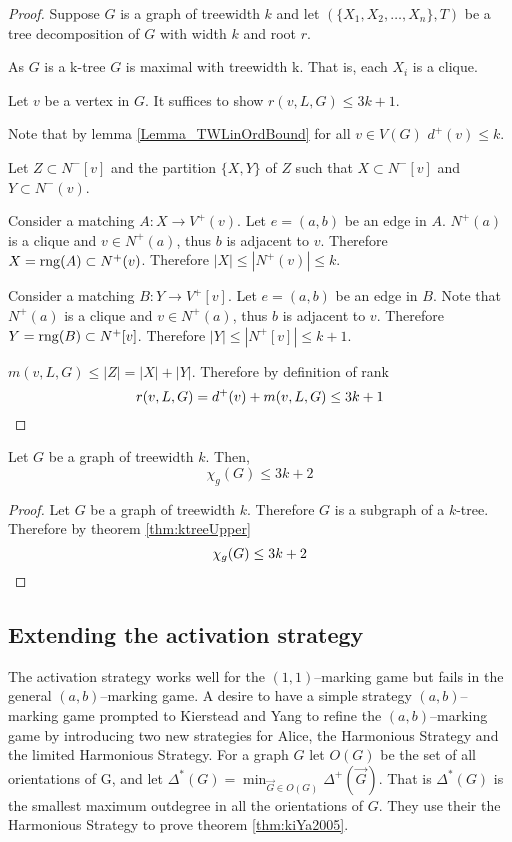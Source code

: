 \begin{proof}
    Suppose $G$ is a graph of treewidth $k$ and let $(\{X_1,X_2,\dots,X_n\},T)$ be a tree decomposition of $G$ with width $k$ and root $r$.
    
    As $G$ is a k-tree $G$ is maximal with treewidth k. That is, each $X_i$ is a clique.
    
    Let $v$ be a vertex in $G$. It suffices to show $r(v,L,G) \leq 3k + 1$.
    
    
    Note that by lemma \ref{Lemma_TWLinOrdBound} for all $v \in V(G)$ $d^+(v) \leq k$.
    
    Let $Z \subset N^-[v]$ and the partition $\{X,Y\}$ of $Z$ such that $X\subset N^-[v]$ and  $Y\subset N^-(v)$.
           
    Consider a matching $A\colon X \to V^+(v)$. Let $e=(a,b)$ be an edge in $A$.
    $N^+(a)$ is a clique and $v\in N^+(a)$, thus $b$ is adjacent to $v$. Therefore $X =\operatorname{rng}(A)\subset N^+(v)$. Therefore $|X| \leq |N^+(v)| \leq k$. 
    
    Consider a matching $B\colon Y \to V^+[v]$. Let $e=(a,b)$ be an edge in $B$.
    Note that $N^+(a)$ is a clique and $v\in N^+(a)$, thus $b$ is adjacent to $v$. Therefore $Y =\operatorname{rng}(B)\subset N^+[v]$. Therefore $|Y| \leq |N^+[v]| \leq k+1$. 
        
    $m(v,L,G) \leq |Z| = |X|+|Y|$. Therefore by definition of rank \[r(v,L,G) = d^+(v) + m(v,L,G) \leq 3k +1 \qedhere\]        
\end{proof}

\begin{corollary}
    Let $G$ be a graph of treewidth $k$. Then, 
    \[\chi_g(G) \leq 3k + 2\]
\end{corollary}

\begin{proof}
    Let $G$ be a graph of treewidth $k$.
    Therefore $G$ is a subgraph of a $k$-tree. Therefore by theorem \ref{thm:ktreeUpper} \[\chi_g(G) \leq 3k + 2 \qedhere\] 
\end{proof}

\subsection{Extending the activation strategy}

The activation strategy works well for the $(1,1)$--marking game but fails in the general $(a,b)$--marking game. A desire to have a simple strategy $(a,b)$--marking game prompted to Kierstead and Yang to refine the $(a,b)$--marking game by introducing two new strategies for Alice, the Harmonious Strategy and the limited Harmonious Strategy.  For a graph $G$ let $O(G)$ be the set of all orientations of G, and let $\Delta^*(G)=\min_{\vec{G}\in O(G)}\Delta^+(\vec{G})$. That is $\Delta^*(G)$ is the smallest maximum outdegree in all the orientations of $G$. They use their the Harmonious Strategy to prove theorem \ref{thm:kiYa2005}.


